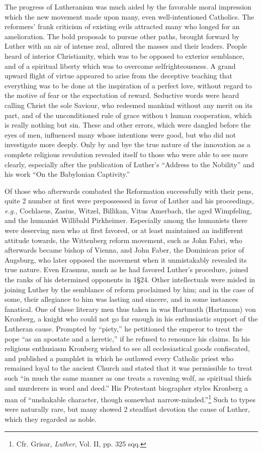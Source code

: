 The progress of Lutheranism was much aided by the favorable
moral impression which the new movement made upon many, even
well-intentioned Catholics. The reformers’ frank criticism of existing
evils attracted many who longed for an amelioration. The bold
proposals to pursue other paths, brought forward by Luther with an
air of intense zeal, allured the masses and their leaders. People heard
of interior Christianity, which was to be opposed to exterior semblance,
and of a spiritual liberty which was to overcome selfrighteousness. A grand
upward flight of virtue appeared to arise from
the deceptive teaching that everything was to be done at the
inspiration of a perfect love, without regard to the motive of
fear or the expectation of reward. Seductive words were heard
calling Christ the sole Saviour, who redeemed mankind without any
merit on its part, and of the unconditioned rule of grace withou
t human cooperation, which is really nothing but sin. These
and other errors, which were dangled before the eyes of men, influenced many whose
intentions were good, but who did not investigate more deeply. Only
by and bye the true nature of the innovation as a complete religious
revolution revealed itself to those who were able to see more clearly,
especially after the publication of Luther’s “Address to the Nobility”
and his work “On the Babylonian Captivity.”

Of those who afterwards combated the Reformation successfully
with their pens, quite 2 number at first were prepossessed in favor of
Luther and his proceedings, \textit{e.g.}, Cochlaeus, Zasius, Witzel, Billikan,
Vitus Amerbach, the aged Wimpfeling, and the humanist Willibald
Pirkheimer. Especially among the humanists there were deserving
men who at first favored, or at least maintained an indifferent attitude
towards, the Wittenberg reform movement, such as John Fabri,
who afterwards became bishop of Vienna, and John Faber, the Dominican prior
of Augsburg, who later opposed the movement when
it unmistakably revealed its true nature. Even Erasmus, much as he
had favored Luther’s procedure, joined the ranks of his determined
opponents in 1§24. Other intellectuals were misled in joining Luther
by the semblance of reform proclaimed by him; and in the case of
some, their allegiance to him was lasting and sincere, and in some instances
fanatical. One of these literary men thus taken in was
Hartmuth (Hartmann) von Kronberg, a knight who could not go far
enough in his enthusiastic support of the Lutheran cause. Prompted
by “piety,” he petitioned the emperor to treat the pope “as an apostate
and a heretic,” if he refused to renounce his claims. In his religious
enthusiasm Kronberg wished to see all ecclesiastical goods
confiscated, and published a pamphlet in which he outlawed every
Catholic priest who remained loyal to the ancient Church and stated
that it was permissible to treat such “in much the same manner
as one treats a ravening wolf, as spiritual thiefs and murderers in
word and deed.” His Protestant biographer styles Kronberg a man of
“unshakable character, though somewhat narrow-minded.”\footnote
{Cfr. Grisar, \textit{Luther}, Vol. II, pp. 325 sqq.}
Such to types were naturally rare, but many showed 2 steadfast devotion
the cause of Luther, which they regarded as noble.


